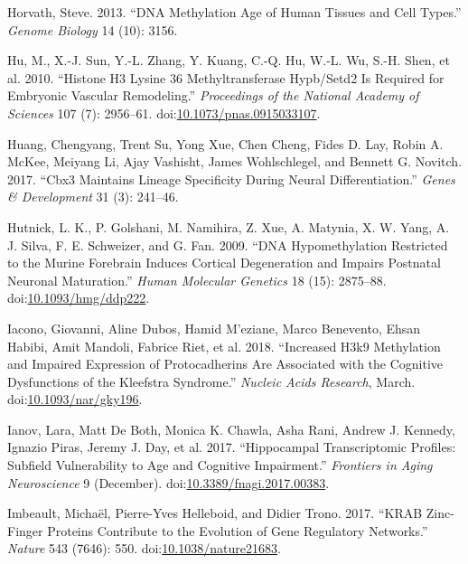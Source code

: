 \documentclass[onehalf,12pt]{beavtex}
\begin{document}
  \hypertarget{ref-HorvathDNAmethylationage2013}{}
  Horvath, Steve. 2013. ``DNA Methylation Age of Human Tissues and Cell
  Types.'' \emph{Genome Biology} 14 (10): 3156.
  
  \hypertarget{ref-HuHistoneH3lysine2010}{}
  Hu, M., X.-J. Sun, Y.-L. Zhang, Y. Kuang, C.-Q. Hu, W.-L. Wu, S.-H.
  Shen, et al. 2010. ``Histone H3 Lysine 36 Methyltransferase Hypb/Setd2
  Is Required for Embryonic Vascular Remodeling.'' \emph{Proceedings of
  the National Academy of Sciences} 107 (7): 2956--61.
  doi:\href{https://doi.org/10.1073/pnas.0915033107}{10.1073/pnas.0915033107}.
  
  \hypertarget{ref-HuangCbx3maintainslineage2017}{}
  Huang, Chengyang, Trent Su, Yong Xue, Chen Cheng, Fides D. Lay, Robin A.
  McKee, Meiyang Li, Ajay Vashisht, James Wohlschlegel, and Bennett G.
  Novitch. 2017. ``Cbx3 Maintains Lineage Specificity During Neural
  Differentiation.'' \emph{Genes \& Development} 31 (3): 241--46.
  
  \hypertarget{ref-HutnickDNAhypomethylationrestricted2009}{}
  Hutnick, L. K., P. Golshani, M. Namihira, Z. Xue, A. Matynia, X. W.
  Yang, A. J. Silva, F. E. Schweizer, and G. Fan. 2009. ``DNA
  Hypomethylation Restricted to the Murine Forebrain Induces Cortical
  Degeneration and Impairs Postnatal Neuronal Maturation.'' \emph{Human
  Molecular Genetics} 18 (15): 2875--88.
  doi:\href{https://doi.org/10.1093/hmg/ddp222}{10.1093/hmg/ddp222}.
  
  \hypertarget{ref-IaconoIncreasedH3K9methylation2018}{}
  Iacono, Giovanni, Aline Dubos, Hamid M\a'eziane, Marco Benevento, Ehsan
  Habibi, Amit Mandoli, Fabrice Riet, et al. 2018. ``Increased H3k9
  Methylation and Impaired Expression of Protocadherins Are Associated
  with the Cognitive Dysfunctions of the Kleefstra Syndrome.''
  \emph{Nucleic Acids Research}, March.
  doi:\href{https://doi.org/10.1093/nar/gky196}{10.1093/nar/gky196}.
  
  \hypertarget{ref-IanovHippocampalTranscriptomicProfiles2017}{}
  Ianov, Lara, Matt De Both, Monica K. Chawla, Asha Rani, Andrew J.
  Kennedy, Ignazio Piras, Jeremy J. Day, et al. 2017. ``Hippocampal
  Transcriptomic Profiles: Subfield Vulnerability to Age and Cognitive
  Impairment.'' \emph{Frontiers in Aging Neuroscience} 9 (December).
  doi:\href{https://doi.org/10.3389/fnagi.2017.00383}{10.3389/fnagi.2017.00383}.
  
  \hypertarget{ref-ImbeaultKRABzincfingerproteins2017}{}
  Imbeault, Michaël, Pierre-Yves Helleboid, and Didier Trono. 2017. ``KRAB
  Zinc-Finger Proteins Contribute to the Evolution of Gene Regulatory
  Networks.'' \emph{Nature} 543 (7646): 550.
  doi:\href{https://doi.org/10.1038/nature21683}{10.1038/nature21683}.
  
\end{document}
